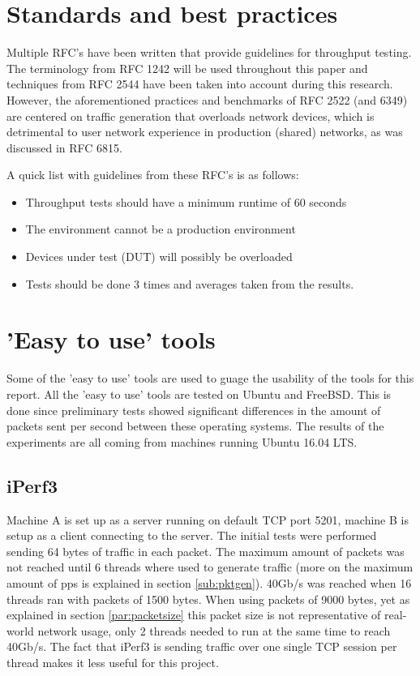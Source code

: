 \section{Standards and best practices}\label{sub:rfc}
Multiple RFC's have been written that provide guidelines for throughput testing.
The terminology from RFC 1242\cite{rfc1242} will be used throughout this paper and techniques from RFC 2544 \cite{rfc2544} have been taken into account during this research.
However, the aforementioned practices and benchmarks of RFC 2522 (and 6349\cite{rfc6349}) are centered on traffic generation that overloads network devices, which is detrimental to user network experience in production (shared) networks, as was discussed in RFC 6815\cite{rfc6815}.

A quick list with guidelines from these RFC's is as follows:

\begin{itemize}
\item{Throughput tests should have a minimum runtime of 60 seconds}
\item{The environment cannot be a production environment}
\item{Devices under test (DUT) will possibly be overloaded}
\item{Tests should be done 3 times and averages taken from the results.}
\end{itemize} 

\section{'Easy to use' tools}
Some of the 'easy to use' tools are used to guage the usability of the tools for this report. All the 'easy to use' tools are tested on Ubuntu and FreeBSD. This is done since preliminary tests showed significant differences in the amount of packets sent per second between these operating systems. The results of the experiments are all coming from machines running Ubuntu 16.04 LTS.  

\subsection{iPerf3}
Machine A is set up as a server running on default TCP port 5201, machine B is setup as a client connecting to the server. 
The initial tests were performed sending 64 bytes of traffic in each packet. The maximum amount of packets was not reached until 6 threads where used to generate traffic (more on the maximum amount of pps is explained in section \ref{sub:pktgen}). 40Gb/s was reached when 16 threads ran with packets of 1500 bytes. When using packets of 9000 bytes, yet as explained in section \ref{par:packetsize} this packet size is not representative of real-world network usage, only 2 threads needed to run at the same time to reach 40Gb/s. The fact that iPerf3 is sending traffic over one single TCP session per thread makes it less useful for this project.

